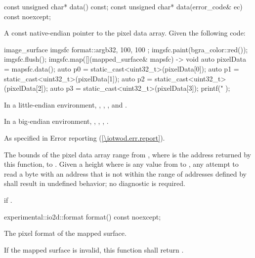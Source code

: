\begin{itemdecl}
const unsigned char* data() const;
const unsigned char* data(error_code& ec) const noexcept;
\end{itemdecl}
\begin{itemdescr}
\pnum
\returns
A const native-endian pointer to the pixel data array.
\enterexample
Given the following code:

\begin{codeblock}
image_surface imgsfc{ format::argb32, 100, 100 };
imgsfc.paint(bgra_color::red());
imgsfc.flush();
imgsfc.map([](mapped_surface& mapsfc) -> void {
    auto pixelData = mapsfc.data();
    auto p0 = static_cast<uint32_t>(pixelData[0]);
    auto p1 = static_cast<uint32_t>(pixelData[1]);
    auto p2 = static_cast<uint32_t>(pixelData[2]);
    auto p3 = static_cast<uint32_t>(pixelData[3]);
    printf("%
});
\end{codeblock}

In a little-endian environment, , , , and .

In a big-endian environment, , , , .
\exitexample

\pnum
\throws
As specified in Error reporting (\ref{\iotwod.err.report}).

\pnum
\remarks
The bounds of the pixel data array range from , where  is the address returned by this function, to . Given a height  where  is any value from  to , any attempt to read a byte with an address that is not within the range of addresses defined by  shall result in undefined behavior; no diagnostic is required.

\pnum
\errors
{} if .
\end{itemdescr}

\begin{itemdecl}
experimental::io2d::format format() const noexcept;
\end{itemdecl}
\begin{itemdescr}
\pnum
\returns
The pixel format of the mapped surface.

\pnum
\remarks
If the mapped surface is invalid, this function shall return .
\end{itemdescr}

